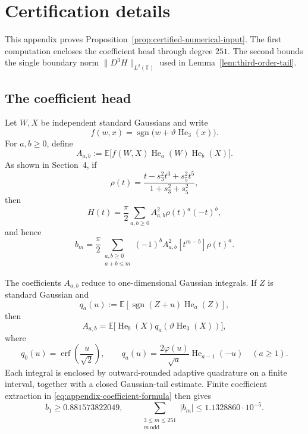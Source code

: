 \section{Certification details}
\label{app:certification-details}

This appendix proves Proposition~\ref{prop:certified-numerical-input}.  The
first computation encloses the coefficient head through degree $251$.  The
second bounds the single boundary norm
$\|D^3H\|_{L^2(\mathbb T)}$ used in
Lemma~\ref{lem:third-order-tail}.

\subsection{The coefficient head}
\label{app:certification-coefficient-head}

Let $W,X$ be independent standard Gaussians and write
\[
  f(w,x)=\operatorname{sgn}\bigl(w+\vartheta\operatorname{He}_3(x)\bigr).
\]
For $a,b\ge0$, define
\[
  A_{a,b}
  :=\mathbb E\bigl[f(W,X)\operatorname{He}_a(W)
  \operatorname{He}_b(X)\bigr].
\]
As shown in Section~4, if
\[
  \rho(t)=\frac{t-s_3^2t^3+s_5^2t^5}{1+s_3^2+s_5^2},
\]
then
\begin{equation}
  H(t)=\frac{\pi}{2}\sum_{a,b\ge0}A_{a,b}^2\rho(t)^a(-t)^b,
  \label{eq:appendix-correlation-expansion}
\end{equation}
and hence
\begin{equation}
  b_m=\frac{\pi}{2}
  \sum_{\substack{a,b\ge0\\a+b\le m}}
  (-1)^bA_{a,b}^2[t^{m-b}]\rho(t)^a.
  \label{eq:appendix-coefficient-formula}
\end{equation}

The coefficients $A_{a,b}$ reduce to one-dimensional Gaussian integrals.  If
$Z$ is standard Gaussian and
\[
  q_a(u):=\mathbb E[\operatorname{sgn}(Z+u)\operatorname{He}_a(Z)],
\]
then
\[
  A_{a,b}
  =\mathbb E\bigl[\operatorname{He}_b(X)
  q_a(\vartheta\operatorname{He}_3(X))\bigr],
\]
where
\[
  q_0(u)=\operatorname{erf}\!\left(\frac{u}{\sqrt2}\right),
  \qquad
  q_a(u)=\frac{2\varphi(u)}{\sqrt a}
  \operatorname{He}_{a-1}(-u)
  \quad(a\ge1).
\]
Each integral is enclosed by outward-rounded adaptive quadrature on a finite
interval, together with a closed Gaussian-tail estimate.  Finite coefficient
extraction in \eqref{eq:appendix-coefficient-formula} then gives
\begin{equation}
  b_1\ge0.881573822049,
  \qquad
  \sum_{\substack{3\le m\le251\\m\ \mathrm{odd}}}|b_m|
  \le1.1328860\cdot10^{-5}.
  \label{eq:appendix-head-output}
\end{equation}

